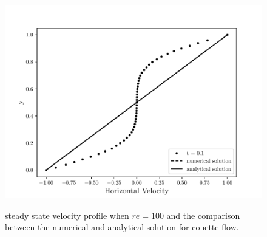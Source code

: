 \vspace{1cm}
\begin{figure}[H]
     \caption{steady state velocity profile when $re=100$ and
     the comparison between the numerical and analytical solution 
     for couette flow.}
     \centering
     \includegraphics[scale=1]{./02_chaps/cap_validation/figure/couette_velocity.pdf}\\
     \medskip
     \label{velocidade couette}
\end{figure}

